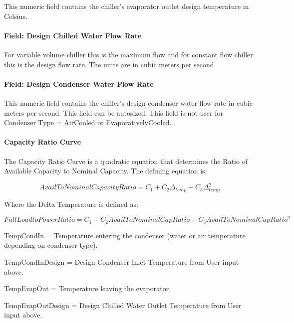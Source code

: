 This numeric field contains the chiller's evaporator outlet design temperature in Celsius.

\paragraph{Field: Design Chilled Water Flow Rate}\label{field-design-chilled-water-flow-rate-4}

For variable volume chiller this is the maximum flow and for constant flow chiller this is the design flow rate. The units are in cubic meters per second.

\paragraph{Field: Design Condenser Water Flow Rate}\label{field-design-condenser-water-flow-rate-3}

This numeric field contains the chiller's design condenser water flow rate in cubic meters per second. This field can be autosized. This field is not user for Condenser Type = AirCooled or EvaporativelyCooled.

\paragraph{Capacity Ratio Curve}\label{capacity-ratio-curve-1}

The Capacity Ratio Curve is a quadratic equation that determines the Ratio of Available Capacity to Nominal Capacity. The defining equation is:

\begin{equation}
    AvailToNominalCapacityRatio = {C_1} + {C_2}{\Delta_{temp}} + {C_3}\Delta_{temp}^2
\end{equation}

Where the Delta Temperature is defined as:

\begin{equation}
    FullLoadtoPowerRatio = {C_1} + {C_2}AvailToNominalCapRatio + {C_3}AvailToNominalCapRati{o^2}
\end{equation}

TempCondIn = Temperature entering the condenser (water or air temperature depending on condenser type).

TempCondInDesign = Design Condenser Inlet Temperature from User input above.

TempEvapOut = Temperature leaving the evaporator.

TempEvapOutDesign = Design Chilled Water Outlet Temperature from User input above.

